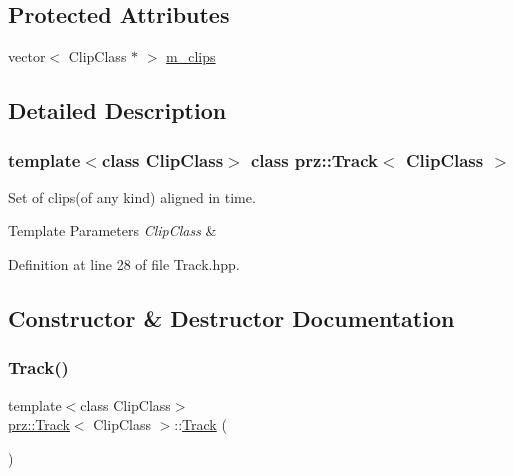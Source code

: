 \subsection*{Protected Attributes}
\begin{DoxyCompactItemize}
\item 
vector$<$ Clip\+Class $\ast$ $>$ \mbox{\hyperlink{classprz_1_1_track_a9f10f83e79d7271343b4b0d5c3db8bff}{m\+\_\+clips}}
\end{DoxyCompactItemize}


\subsection{Detailed Description}
\subsubsection*{template$<$class Clip\+Class$>$\newline
class prz\+::\+Track$<$ Clip\+Class $>$}

Set of clips(of any kind) aligned in time. 


\begin{DoxyTemplParams}{Template Parameters}
{\em Clip\+Class} & \\
\hline
\end{DoxyTemplParams}


Definition at line 28 of file Track.\+hpp.



\subsection{Constructor \& Destructor Documentation}
\mbox{\label{classprz_1_1_track_a65d3d9efb5a6640f94c5f22cacadd625}} 
\subsubsection{\texorpdfstring{Track()}{Track()}}
{\footnotesize\ttfamily template$<$class Clip\+Class$>$ \\
\mbox{\hyperlink{classprz_1_1_track}{prz\+::\+Track}}$<$ Clip\+Class $>$\+::\mbox{\hyperlink{classprz_1_1_track}{Track}} (\begin{DoxyParamCaption}{ }\end{DoxyParamCaption})\hspace{0.3cm}{\ttfamily [inline]}}



